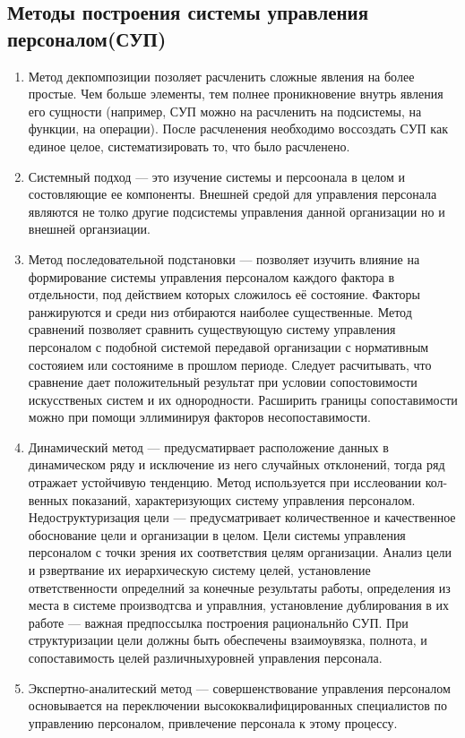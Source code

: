\documentclass[a4paper,12pt,oneside,final]{extarticle}
\numberwithin{equation}{section}
\begin{document}
\subsection{Методы построения системы управления персоналом(СУП)}
\begin{enumerate}
	\item Метод декпомпозиции позоляет расчленить сложные явления на более простые. 
	Чем больше элементы, тем полнее проникновение внутрь явления его сущности (например, СУП можно на расчленить на подсистемы, на функции, на операции). 
	После расчленения необходимо воссоздать СУП как единое целое, систематизировать то, что было расчленено.
	\item Системный подход --- это изучение системы и персоонала в целом и состовляющие ее компоненты. 
	Внешней средой для управления персонала являются не толко другие подсистемы управления данной организации но и внешней органзиации. 
	\item Метод последовательной подстановки --- позволяет изучить влияние на формирование системы управления персоналом каждого фактора в отдельности, под действием которых сложилось её состояние. 
	Факторы ранжируются и среди низ отбираются наиболее существенные. 
	Метод сравнений позволяет сравнить существующую систему управления персоналом с подобной системой передавой организации с нормативным состояием или состояниме в прошлом периоде. 
	Следует расчитывать, что сравнение дает положительный результат при условии сопостовимости искусственых систем и их однородности. 
	Расширить границы сопоставимости можно при помощи эллиминируя факторов несопоставимости. 
	\item Динамический метод --- предусматирвает расположение данных в динамическом ряду и исключение из него случайных отклонений, тогда ряд отражает устойчивую тенденцию. 
	Метод используется при исслеовании кол-венных показаний, характеризующих систему управления персоналом. 
	Недоструктуризация цели --- предусматривает количественное и качественное обоснование цели и организации в целом. 
	Цели системы управления персоналом с точки зрения их соответствия целям организации. 
	Анализ цели и рзвертвание их иерархическую систему целей, установление ответственности определний за конечные результаты работы, определения из места в системе производтсва и управлния, установление дублирования в их работе --- важная предпоссылка построения рациональнйо СУП. 
	При структуризации цели должны быть обеспечены взаимоувязка, полнота, и сопоставимость целей различныхуровней управления персонала. 
	\item Экспертно-аналитеский метод --- совершенствование управления персоналом основывается на переключении высококвалифицированных специалистов по управлению персоналом, привлечение персонала к этому процессу. 

\end{enumerate}
\end{document}
